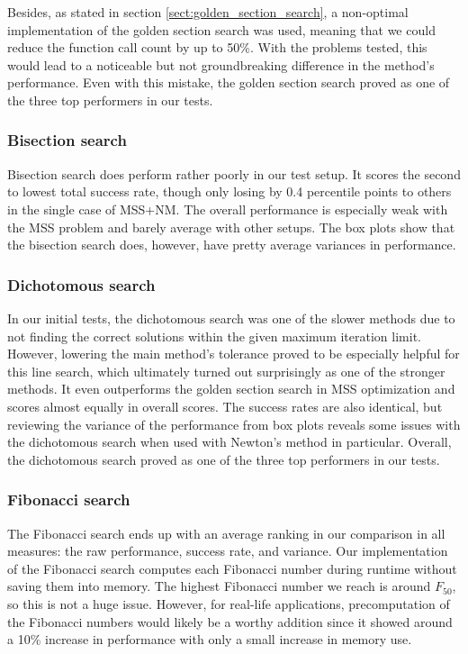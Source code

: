 \documentclass[english, 12pt, a4paper, sci, utf8, a-1b, online, table]{aaltothesis}
\begin{document}
Besides, as stated in section \ref{sect:golden_section_search}, a non-optimal implementation of the golden section search was used, meaning that we could reduce the function call count by up to 50\%. With the problems tested, this would lead to a noticeable but not groundbreaking difference in the method's performance. Even with this mistake, the golden section search proved as one of the three top performers in our tests.

\subsubsection*{Bisection search}

Bisection search does perform rather poorly in our test setup. It scores the second to lowest total success rate, though only losing by 0.4 percentile points to others in the single case of MSS+NM. The overall performance is especially weak with the MSS problem and barely average with other setups. The box plots show that the bisection search does, however, have pretty average variances in performance.

\subsubsection*{Dichotomous search}

In our initial tests, the dichotomous search was one of the slower methods due to not finding the correct solutions within the given maximum iteration limit. However, lowering the main method's tolerance proved to be especially helpful for this line search, which ultimately turned out surprisingly as one of the stronger methods. It even outperforms the golden section search in MSS optimization and scores almost equally in overall scores. The success rates are also identical, but reviewing the variance of the performance from box plots reveals some issues with the dichotomous search when used with Newton's method in particular. Overall, the dichotomous search proved as one of the three top performers in our tests.

\subsubsection*{Fibonacci search}

The Fibonacci search ends up with an average ranking in our comparison in all measures: the raw performance, success rate, and variance. Our implementation of the Fibonacci search computes each Fibonacci number during runtime without saving them into memory. The highest Fibonacci number we reach is around $F_{50}$, so this is not a huge issue. However, for real-life applications, precomputation of the Fibonacci numbers would likely be a worthy addition since it showed around a 10\% increase in performance with only a small increase in memory use.
\end{document}
